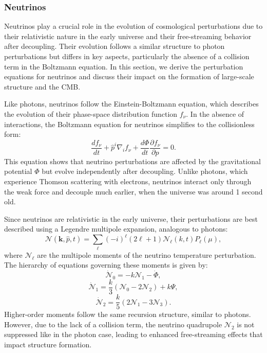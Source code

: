 \documentclass{aa}
\begin{document}
\subsubsection{Neutrinos}
\color{Plum}
Neutrinos play a crucial role in the evolution of cosmological perturbations due to their relativistic nature in the early universe and their free-streaming behavior after decoupling. Their evolution follows a similar structure to photon perturbations but differs in key aspects, particularly the absence of a collision term in the Boltzmann equation. In this section, we derive the perturbation equations for neutrinos and discuss their impact on the formation of large-scale structure and the CMB. 

Like photons, neutrinos follow the Einstein-Boltzmann equation, which describes the evolution of their phase-space distribution function $f_\nu$. In the absence of interactions, the Boltzmann equation for neutrinos simplifies to the collisionless form:
\begin{equation}
\frac{df_\nu}{dt} + \hat{p}^i \nabla_i f_\nu + \frac{d\Phi}{dt} \frac{\partial f_\nu}{\partial p} = 0.
\end{equation}
This equation shows that neutrino perturbations are affected by the gravitational potential $\Phi$ but evolve independently after decoupling. Unlike photons, which experience Thomson scattering with electrons, neutrinos interact only through the weak force and decouple much earlier, when the universe was around 1 second old.

Since neutrinos are relativistic in the early universe, their perturbations are best described using a Legendre multipole expansion, analogous to photons:
\begin{equation}
\mathcal{N}(\mathbf{k}, \hat{p}, t) = \sum_{\ell} (-i)^\ell (2\ell + 1) \mathcal{N}_\ell (k, t) P_\ell(\mu),
\end{equation}
where $\mathcal{N}_\ell$ are the multipole moments of the neutrino temperature perturbation. The hierarchy of equations governing these moments is given by:
\begin{equation}
\dot{\mathcal{N}}_0 = -k \mathcal{N}_1 - \dot{\Phi},
\end{equation}\begin{equation}
\dot{\mathcal{N}}_1 = \frac{k}{3} \left(\mathcal{N}_0 - 2 \mathcal{N}_2 \right) + k \Psi,
\end{equation}\begin{equation}
\dot{\mathcal{N}}_2 = \frac{k}{5} \left(2 \mathcal{N}_1 - 3 \mathcal{N}_3 \right).
\end{equation}
Higher-order moments follow the same recursion structure, similar to photons. However, due to the lack of a collision term, the neutrino quadrupole $\mathcal{N}_2$ is not suppressed like in the photon case, leading to enhanced free-streaming effects that impact structure formation. 
\end{document}
